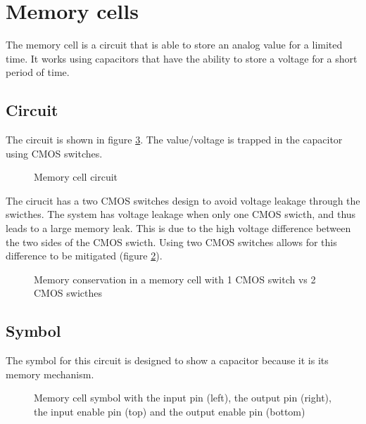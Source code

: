 \section{Memory cells}
\label{sec:memcell}

The memory cell is a circuit that is able to store an analog value for a limited time. It works using capacitors that have the ability to store a voltage for a short period of time.

\subsection{Circuit}

The circuit is shown in figure \ref{fig:memcellCircuit}. The value/voltage is trapped in the capacitor using CMOS switches.

\begin{figure}[H]
  \centering
  
  \caption{Memory cell circuit}
  \label{fig:memcellCircuit}
\end{figure}

The cirucit has a two CMOS switches design to avoid voltage leakage through the swicthes. The system has voltage leakage when only one CMOS swicth, and thus leads to a large memory leak. This is due to the high voltage difference between the two sides of the CMOS swicth. Using two CMOS switches allows for this difference to be mitigated (figure \ref{fig:memcellLoss}).

\begin{figure}[H]
  \centering
  
  \caption{Memory conservation in a memory cell with 1 CMOS switch vs 2 CMOS swicthes}
  \label{fig:memcellLoss}
\end{figure}

\subsection{Symbol}

The symbol for this circuit is designed to show a capacitor because it is its memory mechanism.

\begin{figure}[H]
  \centering
  
  \caption{Memory cell symbol with the input pin (left), the output pin (right), the input enable pin (top) and the output enable pin (bottom)}
  \label{fig:memcellCircuit}
\end{figure}

